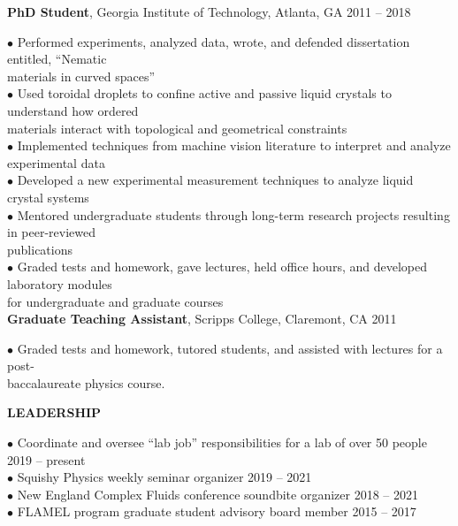 \documentclass[10pt]{article}
\newenvironment{changemargin}[2]{%
  \list{}{\rightmargin#2\leftmargin#1
    \parsep=0pt\topsep=1pt\partopsep=0pt}
\item[]} {\endlist}
\newenvironment{indentmore}{\begin{changemargin}{10pt}{0cm}}{\end{changemargin}}
\begin{document}
\begin{indentmore}
{\bf PhD Student}, Georgia Institute of Technology, Atlanta, GA \hfill 2011 -- 2018
\begin{indentmore}
$\bullet$ Performed experiments, analyzed data, wrote, and defended dissertation entitled, ``Nematic\\ \hspace*{5pt} materials in curved spaces''\\
$\bullet$ Used toroidal droplets to confine active and passive liquid crystals to understand how ordered\\ \hspace*{5pt} materials interact with topological and geometrical constraints\\
$\bullet$ Implemented techniques from machine vision literature to interpret and analyze\\ \hspace*{5pt} experimental data\\
$\bullet$ Developed a new experimental measurement techniques to analyze liquid crystal systems\\
$\bullet$ Mentored undergraduate students through long-term research projects resulting in peer-reviewed\\ \hspace*{5pt} publications\\
$\bullet$ Graded tests and homework, gave lectures, held office hours, and developed laboratory modules\\ \hspace*{5pt} for undergraduate and graduate courses\\
\end{indentmore}
{\bf  Graduate Teaching Assistant}, Scripps College, Claremont, CA \hfill 2011
\begin{indentmore}
  $\bullet$ Graded tests and homework, tutored students, and assisted with lectures for a post-\\ \hspace*{5pt} baccalaureate physics course.\\
\end{indentmore}
\end{indentmore}

\textbf{\large LEADERSHIP}
\begin{indentmore}
\begin{indentmore}
$\bullet$ Coordinate and oversee ``lab job'' responsibilities for a lab of over 50 people \hfill 2019 -- present\\
$\bullet$ Squishy Physics weekly seminar organizer \hfill 2019 -- 2021\\
$\bullet$ New England Complex Fluids conference soundbite organizer \hfill 2018 -- 2021\\
$\bullet$ FLAMEL program graduate student advisory board member \hfill 2015 -- 2017\\
\end{indentmore}
\end{indentmore}
\end{document}

